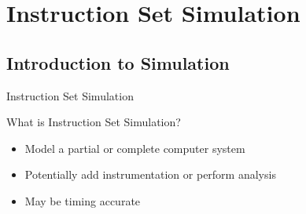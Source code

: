 \section{Instruction Set Simulation}

\subsection{Introduction to Simulation}

\begin{frame}{Instruction Set Simulation}

What is Instruction Set Simulation? 

\begin{itemize}
\item<2-> Model a partial or complete computer system
\item<3-> Potentially add instrumentation or perform analysis
\item<4-> May be timing accurate
\end{itemize}


\end{frame}

